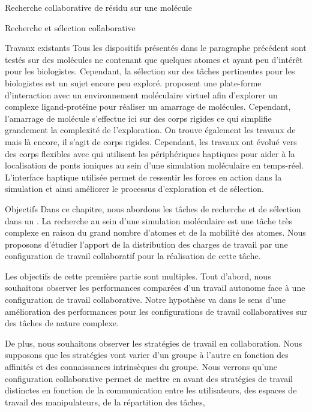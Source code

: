 \documentclass[myfrancais,ngerman,english,frenchb]{mythesis}
\begin{document}
\begin{mychapter}{Recherche collaborative de résidu sur une molécule}
\begin{mysection}{Recherche et sélection collaborative}
\begin{mysubsection}{Travaux existants}
				Tous les dispositifs présentés dans le paragraphe précédent sont testés sur des molécules ne contenant que quelques atomes et ayant peu d'intérêt pour les biologistes.
				Cependant, la sélection sur des tâches pertinentes pour les biologistes est un sujet encore peu exploré.
				 proposent une plate-forme d'interaction avec un environnement moléculaire virtuel afin d'explorer un complexe ligand-protéine pour réaliser un amarrage de molécules.
				Cependant, l'amarrage de molécule s'effectue ici sur des corps rigides ce qui simplifie grandement la complexité de l'exploration.
				On trouve également les travaux de  mais là encore, il s'agit de corps rigides.
				Cependant, les travaux ont évolué vers des corps flexibles avec  qui utilisent les périphériques haptiques pour aider à la localisation de ponts ioniques au sein d'une simulation moléculaire en temps-réel.
				L'interface haptique utilisée permet de ressentir les forces en action dans la simulation et ainsi améliorer le processus d'exploration et de sélection.
			\end{mysubsection}
			\begin{mysubsection}{Objectifs}
				Dans ce chapitre, nous abordons les tâches de recherche et de sélection dans un .
				La recherche au sein d'une simulation moléculaire est une tâche très complexe en raison du grand nombre d'atomes et de la mobilité des atomes.
				Nous proposons d'étudier l'apport de la distribution des charges de travail par une configuration de travail collaboratif pour la réalisation de cette tâche.

				Les objectifs de cette première partie sont multiples.
				Tout d'abord, nous souhaitons observer les performances comparées d'un travail autonome face à une configuration de travail collaborative.
				Notre hypothèse va dans le sens d'une amélioration des performances pour les configurations de travail collaboratives sur des tâches de nature complexe.

				De plus, nous souhaitons observer les stratégies de travail en collaboration.
				Nous supposons que les stratégies vont varier d'un groupe à l'autre en fonction des affinités et des connaissances intrinsèques du groupe.
				Nous verrons qu'une configuration collaborative permet de mettre en avant des stratégies de travail distinctes en fonction de la communication entre les utilisateurs, des espaces de travail des manipulateurs, de la répartition des tâches, \myetc


\end{mysubsection}
\end{mysection}
\end{mychapter}
\end{document}
